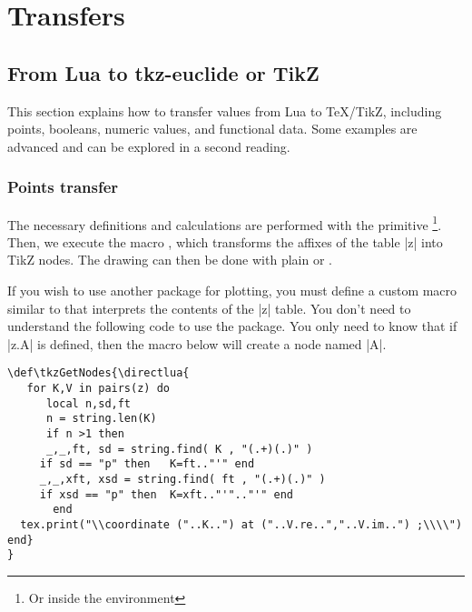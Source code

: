 \newpage
\section{Transfers} %
\label{sec:transfers}
\subsection{From Lua to tkz-euclide or TikZ} %
\label{sub:from_lua_to_tkz_euclide_or_tikz}

This section explains how to transfer values from Lua to TeX/TikZ, including points, booleans, numeric values, and functional data. Some examples are advanced and can be explored in a second reading.

\subsubsection{Points transfer} %
\label{ssub:points_transfer}

The necessary definitions and calculations are performed with the primitive \footnote{Or inside the  environment}. Then, we execute the macro , which transforms the affixes of the table |z| into TikZ nodes. The drawing can then be done with plain \TIKZ{} or .

If you wish to use another package for plotting, you must define a custom macro similar to  that interprets the contents of the |z| table. You don't need to understand the following code to use the package. You only need to know that if |z.A| is defined, then the macro below will create a node named |A|.


\vspace*{1em}

\begin{mybox}
\begin{verbatim}
\def\tkzGetNodes{\directlua{
   for K,V in pairs(z) do
      local n,sd,ft
      n = string.len(K)
      if n >1 then
      _,_,ft, sd = string.find( K , "(.+)(.)" )  
     if sd == "p" then   K=ft.."'" end 
     _,_,xft, xsd = string.find( ft , "(.+)(.)" ) 
     if xsd == "p" then  K=xft.."'".."'" end 
       end    
  tex.print("\\coordinate ("..K..") at ("..V.re..","..V.im..") ;\\\\")
end}
}
\end{verbatim}
\end{mybox}

